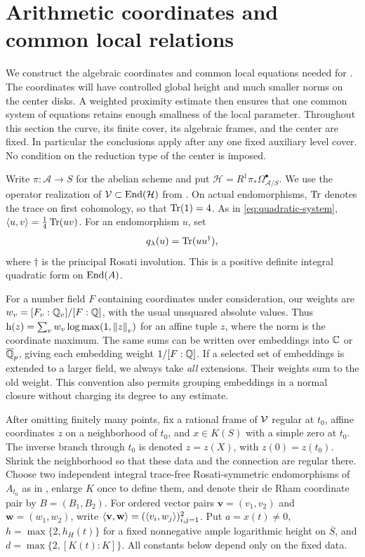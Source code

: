 \section{Arithmetic coordinates and common local relations}\label{sec:arithmetic}

We construct the algebraic coordinates and common local equations needed
for .  The coordinates will have controlled global
height and much smaller norms on the center disks.  A weighted proximity
estimate then ensures that one common system of equations retains enough
smallness of the local parameter.  Throughout this section the curve, its
finite cover, its algebraic frames, and the center are fixed.  In
particular the conclusions apply after any one fixed auxiliary level
cover.  No condition on the reduction type of the center is imposed.

Write $\pi:\mathcal A\to S$ for the abelian scheme and put
$\mathcal H=R^1\pi_*\Omega^\bullet_{\mathcal A/S}$.  We use the
operator realization of $\mathcal V\subset\operatorname{End}(\mathcal H)$ from
.  On actual endomorphisms, $\operatorname{Tr}$ denotes the trace
on first cohomology, so that $\operatorname{Tr}(1)=4$.  As in
\eqref{eq:quadratic-system}, $\left\langle u,v\right\rangle=\tfrac14\operatorname{Tr}(uv)$.
For an endomorphism $u$, set
\[
 q_\lambda(u)=\operatorname{Tr}(uu^\dagger),
\]
where $\dagger$ is the principal Rosati involution.  This is a positive
definite integral quadratic form on $\operatorname{End}(A)$.

For a number field $F$ containing coordinates under consideration, our
weights are $w_v=[F_v:\mathbb Q_v]/[F:\mathbb Q]$, with the usual unsquared absolute
values.  Thus $\mathrm h\!\left(z\right)=\sum_v w_v\log\max(1,\left\lVert z\right\rVert_v)$ for an
affine tuple $z$, where the norm is the coordinate maximum.  The same sums
can be written over embeddings into $\mathbb C$ or $\overline{\mathbb Q}_p$, giving
each embedding weight $1/[F:\mathbb Q]$.  If a selected set of embeddings is
extended to a larger field, we always take \emph{all} extensions.  Their
weights sum to the old weight.  This convention also permits grouping
embeddings in a normal closure without charging its degree to any estimate.

After omitting finitely many points, fix a rational frame of $\mathcal V$
regular at $t_0$, affine coordinates $z$ on a neighborhood of $t_0$, and
$x\in K(S)$ with a simple zero at $t_0$.  The inverse branch through
$t_0$ is denoted $z=z(X)$, with $z(0)=z(t_0)$.  Shrink the neighborhood
so that these data and the connection are regular there.
Choose two independent integral trace-free Rosati-symmetric endomorphisms
of $A_{t_0}$ as in , enlarge $K$ once to define them,
and denote their de Rham coordinate pair by $B=(B_1,B_2)$.
For ordered vector pairs $\mathbf v=(v_1,v_2)$ and
$\mathbf w=(w_1,w_2)$, write
$\left\langle\mathbf v,\mathbf w\right\rangle=(\left\langle v_i,w_j\right\rangle)_{i,j=1}^2$.
Put
$a=x(t)\ne0$, $h=\max\{2,h_H(t)\}$ for a fixed nonnegative
ample logarithmic height on $\overline S$, and
$d=\max\{2,[K(t):K]\}$.
All constants below depend only on the fixed data.

